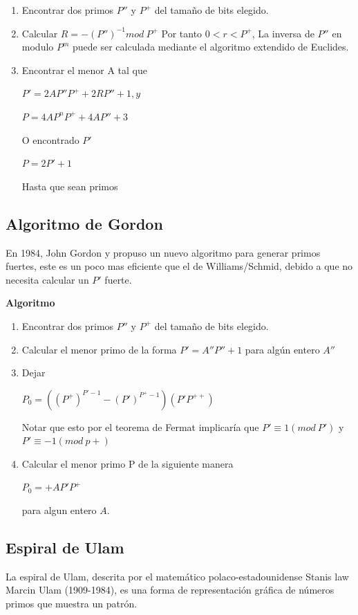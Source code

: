 \documentclass[11pt, conference]{IEEEtran}
\begin{document}
\begin{enumerate}
	\item Encontrar dos primos $P''$ y $P^{+}$ del tamaño de bits elegido.
	\item Calcular $R=-(P'')^{-1}mod\ P^{+}$
	Por tanto $0 < r < P^{+}$, La inversa de $P''$ en modulo $P^{m}$ puede ser	calculada mediante el algoritmo extendido de Euclides.
	\item Encontrar el menor A tal que
	
	\begin{center}
		$P' = 2AP''P^{+}+2RP''+1,y$
		
		$P=4AP^{n}P^{+}+4AP''+3$	
	\end{center}
	O encontrado $P'$
	\begin{center}
		$P=2P'+1$	
	\end{center}
	Hasta que sean primos
\end{enumerate}
\subsection{Algoritmo de Gordon}
En 1984, John Gordon y propuso un nuevo algoritmo para generar primos fuertes, este es un poco mas eficiente que el de Williams/Schmid, debido a que no necesita calcular un $P'$ fuerte.

\textbf{Algoritmo}
\begin{enumerate}
	\item Encontrar dos primos $P''$ y $P^{+}$ del tamaño de bits elegido.
	\item Calcular el menor primo de la forma $P' = A''P'' + 1$ para algún entero $A''$
	\item Dejar
	\begin{center}
		$P_{0} = ((P^{+})^{P'-1}-(P')^{P^{+}-1})(P'P^{++})$
	\end{center}
	
	Notar que esto por el teorema de Fermat implicaría que $P' \equiv 1(mod\ P')$ y $P' \equiv -1 (mod\ p+)$
	
	\item Calcular el menor primo P de la siguiente manera
	\begin{center}
		$P_{0}=+AP'P^{+}$	
	\end{center}
	para algun entero $A$.
\end{enumerate}

\subsection{Espiral de Ulam}
La espiral de Ulam, descrita por el matemático polaco-estadounidense Stanis law Marcin Ulam (1909-1984), es una forma de representación gráfica de números primos que muestra un patrón.
\end{document}

